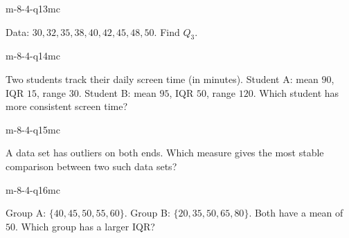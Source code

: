 \begin{practiceQuestion}{m-8-4-q13}{mc}
\begin{questionText}
Data: $30, 32, 35, 38, 40, 42, 45, 48, 50$. Find $Q_3$.
\end{questionText}
\end{practiceQuestion}

\begin{practiceQuestion}{m-8-4-q14}{mc}
\begin{questionText}
Two students track their daily screen time (in minutes). Student A: mean $90$, IQR $15$, range $30$. Student B: mean $95$, IQR $50$, range $120$. Which student has more consistent screen time?
\end{questionText}
\end{practiceQuestion}

\begin{practiceQuestion}{m-8-4-q15}{mc}
\begin{questionText}
A data set has outliers on both ends. Which measure gives the most stable comparison between two such data sets?
\end{questionText}
\end{practiceQuestion}

\begin{practiceQuestion}{m-8-4-q16}{mc}
\begin{questionText}
Group A: $\{40, 45, 50, 55, 60\}$. Group B: $\{20, 35, 50, 65, 80\}$. Both have a mean of $50$. Which group has a larger IQR?
\end{questionText}
\end{practiceQuestion}

